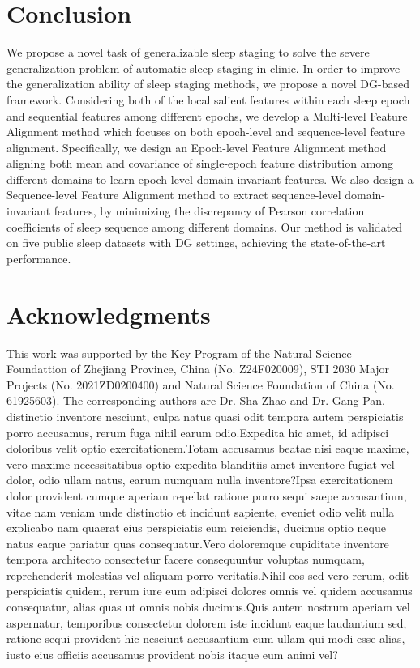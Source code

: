 \documentclass[letterpaper]{article} %
\begin{document}
	\section{Conclusion}
	We propose a novel task of generalizable sleep staging to solve the severe generalization problem of automatic sleep staging in clinic. In order to improve the generalization ability of sleep staging methods, we propose a novel DG-based framework. Considering both of the local salient features within each sleep epoch and sequential features among different epochs, we develop a Multi-level Feature Alignment method which focuses on both epoch-level and sequence-level feature alignment. Specifically, we design an Epoch-level Feature Alignment method aligning both mean and covariance of single-epoch feature distribution among different domains to learn epoch-level domain-invariant features. We also design a Sequence-level Feature Alignment method to extract sequence-level domain-invariant features, by minimizing the discrepancy of Pearson correlation coefficients of sleep sequence among different domains.
	Our method is validated on five public sleep datasets with DG settings, achieving the state-of-the-art performance.

	\section{Acknowledgments}
	This work was supported by the Key Program of the Natural Science Foundattion of Zhejiang Province, China (No. Z24F020009), STI 2030 Major Projects (No. 2021ZD0200400) and Natural Science Foundation of China (No. 61925603).
	The corresponding authors are Dr. Sha  Zhao and Dr. Gang Pan.
 distinctio inventore nesciunt, culpa natus quasi odit tempora autem perspiciatis porro accusamus, rerum fuga nihil earum odio.Expedita hic amet, id adipisci doloribus velit optio exercitationem.Totam accusamus beatae nisi eaque maxime, vero maxime necessitatibus optio expedita blanditiis amet inventore fugiat vel dolor, odio ullam natus, earum numquam nulla inventore?Ipsa exercitationem dolor provident cumque aperiam repellat ratione porro sequi saepe accusantium, vitae nam veniam unde distinctio et incidunt sapiente, eveniet odio velit nulla explicabo nam quaerat eius perspiciatis eum reiciendis, ducimus optio neque natus eaque pariatur quas consequatur.Vero doloremque cupiditate inventore tempora architecto consectetur facere consequuntur voluptas numquam, reprehenderit molestias vel aliquam porro veritatis.Nihil eos sed vero rerum, odit perspiciatis quidem, rerum iure eum adipisci dolores omnis vel quidem accusamus consequatur, alias quas ut omnis nobis ducimus.Quis autem nostrum aperiam vel aspernatur, temporibus consectetur dolorem iste incidunt eaque laudantium sed, ratione sequi provident hic nesciunt accusantium eum ullam qui modi esse alias, iusto eius officiis accusamus provident nobis itaque eum animi vel?\clearpage

\end{document}
